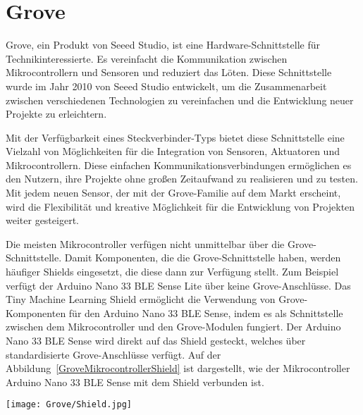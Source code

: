 %
%
%

\chapter{Grove}

Grove, ein Produkt von Seeed Studio, ist eine Hardware-Schnittstelle für Technikinteressierte. Es vereinfacht die Kommunikation zwischen Mikrocontrollern und Sensoren und reduziert das Löten. Diese Schnittstelle wurde im Jahr 2010 von Seeed Studio entwickelt, um die Zusammenarbeit zwischen verschiedenen Technologien zu vereinfachen und die Entwicklung neuer Projekte zu erleichtern.\cite{Seeed:2012,Seeed:2013}

Mit der Verfügbarkeit eines Steckverbinder-Typs bietet diese Schnittstelle eine Vielzahl von Möglichkeiten für die Integration von Sensoren, Aktuatoren und Mikrocontrollern. Diese einfachen Kommunikationsverbindungen ermöglichen es den Nutzern, ihre Projekte ohne großen Zeitaufwand zu realisieren und zu testen. \cite{Seeed:2016} Mit jedem neuen Sensor, der mit der Grove-Familie auf dem Markt erscheint, wird die Flexibilität und kreative Möglichkeit für die Entwicklung von Projekten weiter gesteigert. 




Die meisten Mikrocontroller verfügen nicht unmittelbar über die Grove-Schnittstelle. Damit Komponenten, die die Grove-Schnittstelle haben, werden häufiger Shields eingesetzt, die diese dann zur Verfügung stellt. Zum Beispiel verfügt  der Arduino Nano 33 BLE Sense Lite über keine Grove-Anschlüsse. Das Tiny Machine Learning Shield ermöglicht die Verwendung von Grove-Komponenten für den Arduino Nano 33 BLE Sense, indem es als Schnittstelle zwischen dem Mikrocontroller und den Grove-Modulen fungiert. Der Arduino Nano 33 BLE Sense wird direkt auf das Shield gesteckt, welches über standardisierte Grove-Anschlüsse verfügt. Auf der Abbildung~\ref{GroveMikrocontrollerShield} ist dargestellt, wie der Mikrocontroller Arduino Nano 33 BLE Sense mit dem Shield verbunden ist.

    \begin{center}
        \texttt{[image: Grove/Shield.jpg]}
        \label{GroveMikrocontrollerShield}
    \end{center}


